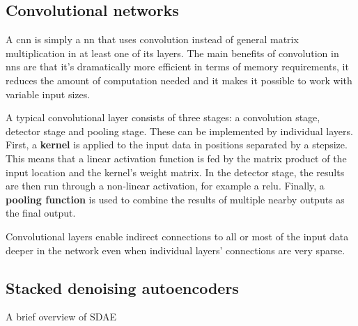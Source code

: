 \subsection{Convolutional networks}

A \ac{cnn} is simply a \ac{nn} that uses convolution instead of general matrix
multiplication in at least one of its layers. The main benefits of convolution in \ac{nn}s
are that it's dramatically more efficient in terms of memory requirements, it reduces
the amount of computation needed and it makes it possible to work with variable input
sizes.

A typical convolutional layer consists of three stages: a convolution stage, detector
stage and pooling stage. These can be implemented by individual layers. First, a
\textbf{kernel} is applied to the input data in positions separated by a stepsize. This
means that a linear activation function is fed by the matrix product of the input location
and the kernel's weight matrix. In the detector stage, the results are then run through
a non-linear activation, for example a \ac{relu}. Finally, a \textbf{pooling function}
is used to combine the results of multiple nearby outputs as the final output.

Convolutional layers enable indirect connections to all or most of the input data deeper
in the network even when individual layers' connections are very sparse.

\subsection{Stacked denoising autoencoders}
A brief overview of SDAE